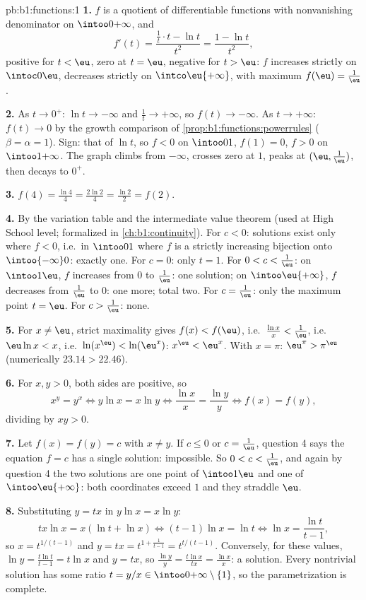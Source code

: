 \begin{solution}{pb:b1:functions:1}
\textbf{1.} $f$ is a quotient of differentiable functions with
nonvanishing denominator on $\intoo0{+\infty}$, and
\[
f'(t) = \frac{\frac1t \cdot t - \ln t}{t^2} = \frac{1 - \ln
t}{t^2} ,
\]
positive for $t < \eu$, zero at $t = \eu$, negative for $t > \eu$:
$f$ increases strictly on $\intoc0\eu$, decreases strictly on
$\intco\eu{+\infty}$, with maximum $f(\eu) = \frac1\eu$.

\textbf{2.} As $t \to 0^+$: $\ln t \to -\infty$ and $\frac1t \to
+\infty$, so $f(t) \to -\infty$. As $t \to +\infty$: $f(t) \to 0$
by the growth comparison of \cref{prop:b1:functions:powerrules}
($\beta = \alpha = 1$). Sign: that of $\ln t$, so $f < 0$ on
$\intoo01$, $f(1) = 0$, $f > 0$ on $\intoo1{+\infty}$. The graph
climbs from $-\infty$, crosses zero at $1$, peaks at $(\eu,
\frac1\eu)$, then decays to $0^+$.

\textbf{3.} $f(4) = \frac{\ln 4}4 = \frac{2\ln 2}4 = \frac{\ln 2}2
= f(2)$.

\textbf{4.} By the variation table and the intermediate value
theorem (used at High School level; formalized in
\cref{ch:b1:continuity}). For $c < 0$: solutions exist only where
$f < 0$, i.e.\ in $\intoo01$ where $f$ is a strictly increasing
bijection onto $\intoo{-\infty}0$: exactly one. For $c = 0$: only
$t = 1$. For $0 < c < \frac1\eu$: on $\intoo1\eu$, $f$ increases
from $0$ to $\frac1\eu$: one solution; on $\intoo\eu{+\infty}$,
$f$ decreases from $\frac1\eu$ to $0$: one more; total two. For
$c = \frac1\eu$: only the maximum point $t = \eu$. For $c >
\frac1\eu$: none.

\textbf{5.} For $x \neq \eu$, strict maximality gives $f(x) <
f(\eu)$, i.e.\ $\frac{\ln x}x < \frac1\eu$, i.e.\ $\eu\ln x < x$,
i.e.\ $\ln(x^\eu) < \ln(\eu^x)$: $x^\eu < \eu^x$. With $x = \pi$:
$\eu^\pi > \pi^\eu$ (numerically $23.14 > 22.46$).

\textbf{6.} For $x, y > 0$, both sides are positive, so
\[
x^y = y^x \iff y\ln x = x\ln y \iff \frac{\ln x}x = \frac{\ln y}y
\iff f(x) = f(y) ,
\]
dividing by $xy > 0$.

\textbf{7.} Let $f(x) = f(y) = c$ with $x \neq y$. If $c \leq 0$ or
$c = \frac1\eu$, question 4 says the equation $f = c$ has a single
solution: impossible. So $0 < c < \frac1\eu$, and again by
question 4 the two solutions are one point of $\intoo1\eu$ and one
of $\intoo\eu{+\infty}$: both coordinates exceed $1$ and they
straddle $\eu$.

\textbf{8.} Substituting $y = tx$ in $y\ln x = x\ln y$:
\[
tx\ln x = x(\ln t + \ln x)
\iff (t - 1)\ln x = \ln t
\iff \ln x = \frac{\ln t}{t - 1} ,
\]
so $x = t^{1/(t-1)}$ and $y = tx = t^{1 + \frac1{t-1}} =
t^{t/(t-1)}$. Conversely, for these values, $\ln y = \frac{t\ln
t}{t-1} = t\ln x$ and $y = tx$, so $\frac{\ln y}y = \frac{t\ln
x}{tx} = \frac{\ln x}x$: a solution. Every nontrivial solution has
some ratio $t = y/x \in \intoo0{+\infty} \setminus \{1\}$, so the
parametrization is complete.


\end{solution}
